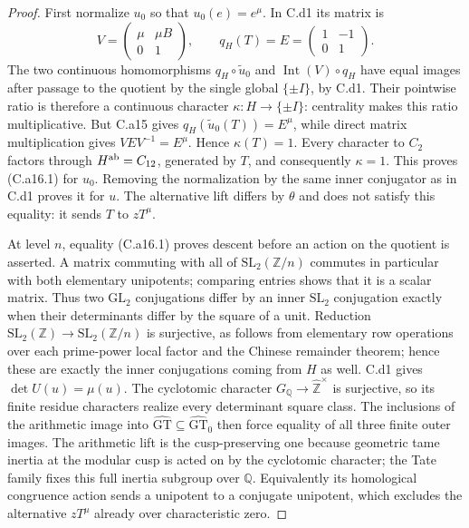 \begin{proof}
First normalize $u_0$ so that $u_0(e)=e^\mu$. In C.d1 its matrix is
\[
 V=\begin{pmatrix}\mu&\mu B\\0&1\end{pmatrix},\qquad
 q_H(T)=E=\begin{pmatrix}1&-1\\0&1\end{pmatrix}.
\]
The two continuous homomorphisms $q_H\circ\widetilde u_0$ and
$\operatorname{Int}(V)\circ q_H$ have equal images after passage to
the quotient by the single global $\{\pm I\}$, by C.d1. Their
pointwise ratio is therefore a continuous character
$\kappa:H\to\{\pm I\}$: centrality makes this ratio multiplicative.
But C.a15 gives $q_H(\widetilde u_0(T))=E^\mu$, while direct matrix
multiplication gives $VEV^{-1}=E^\mu$. Hence $\kappa(T)=1$.
Every character to $C_2$ factors through $H^{\rm ab}=C_{12}$, generated
by $T$, and consequently $\kappa=1$. This proves (C.a16.1) for $u_0$.
Removing the normalization by the same inner conjugator as in C.d1
proves it for $u$. The alternative lift differs by $\theta$ and does
not satisfy this equality: it sends $T$ to $zT^\mu$.

At level $n$, equality (C.a16.1) proves descent before an action on the
quotient is asserted. A matrix commuting with all of
$\mathrm{SL}_2(\mathbb Z/n)$ commutes in particular with both elementary
unipotents; comparing entries shows that it is a scalar matrix.
Thus two $\mathrm{GL}_2$ conjugations differ by an inner $\mathrm{SL}_2$
conjugation exactly when their determinants differ by the square of a
unit. Reduction $\mathrm{SL}_2(\mathbb Z)\to
\mathrm{SL}_2(\mathbb Z/n)$ is surjective, as follows from elementary
row operations over each prime-power local factor and the Chinese
remainder theorem; hence these are exactly the inner conjugations
coming from $H$ as well. C.d1 gives $\det U(u)=\mu(u)$.
The cyclotomic character $G_{\mathbb Q}\to\widehat{\mathbb Z}^{\times}$
is surjective, so its finite residue characters realize every determinant
square class. The inclusions of the arithmetic image into
$\widehat{\mathrm{GT}}\subseteq\widehat{\mathrm{GT}}_0$ then force
equality of all three finite outer images. The arithmetic lift is the
cusp-preserving one because geometric tame inertia at the modular cusp
is acted on by the cyclotomic character; the Tate family fixes this
full inertia subgroup over $\mathbb Q$. Equivalently its homological
congruence action sends a unipotent to a conjugate unipotent, which
excludes the alternative $zT^\mu$ already over characteristic zero.
\end{proof}
